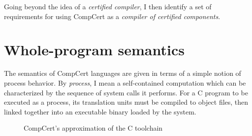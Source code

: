 \documentclass[11pt,oneside]{book}
\theoremstyle{definition}
\begin{document}
Going beyond the idea of a
\emph{certified compiler},
I then identify a set of requirements
for using CompCert as a
\emph{compiler of certified components}.

\section{Whole-program semantics} \label{sec:sem:closed} %


The semantics of CompCert languages
are given in terms of a simple notion of process behavior.
By \emph{process}, I mean a self-contained computation
which can be characterized by
the sequence of system calls it performs.
For a C program to be executed as a process,
its translation units must be compiled to object files,
then linked together
into an executable binary
loaded by the system.

\begin{figure} %
  \centering
    \caption{CompCert's approximation of the C toolchain}
    \label{fig:process}
\end{figure}
\end{document}
